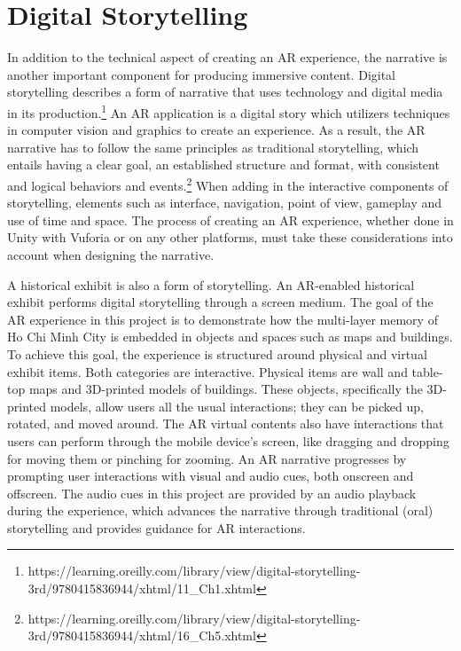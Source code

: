 \section{Digital Storytelling}
In addition to the technical aspect of creating an AR experience, the narrative is another important component for producing immersive content. Digital storytelling describes a form of narrative that uses technology and digital media in its production.\footnote{https://learning.oreilly.com/library/view/digital-storytelling-3rd/9780415836944/xhtml/11\_Ch1.xhtml} An AR application is a digital story which utilizers techniques in computer vision and graphics to create an experience. As a result, the AR narrative has to follow the same principles as traditional storytelling, which entails having a clear goal, an established structure and format, with consistent and logical behaviors and events.\footnote{https://learning.oreilly.com/library/view/digital-storytelling-3rd/9780415836944/xhtml/16\_Ch5.xhtml} When adding in the interactive components of storytelling, elements such as interface, navigation, point of view, gameplay and use of time and space. The process of creating an AR experience, whether done in Unity with Vuforia or on any other platforms, must take these considerations into account when designing the narrative.

A historical exhibit is also a form of storytelling. An AR-enabled historical exhibit performs digital storytelling through a screen medium. The goal of the AR experience in this project is to demonstrate how the multi-layer memory of Ho Chi Minh City is embedded in objects and spaces such as maps and buildings. To achieve this goal, the experience is structured around physical and virtual exhibit items. Both categories are interactive. Physical items are wall and table-top maps and 3D-printed models of buildings. These objects, specifically the 3D-printed models, allow users all the usual interactions; they can be picked up, rotated, and moved around. The AR virtual contents also have interactions that users can perform through the mobile device's screen, like dragging and dropping for moving them or pinching for zooming. An AR narrative progresses by prompting user interactions with visual and audio cues, both onscreen and offscreen. The audio cues in this project are provided by an audio playback during the experience, which advances the narrative through traditional (oral) storytelling and provides guidance for AR interactions. 

